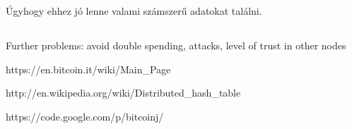 \documentclass[a4paper,12pt]{article}
\begin{document}
Úgyhogy ehhez jó lenne valami számszerű adatokat találni.

\subsection{}
Further problems: avoid double spending, attacks, level of trust in other nodes




\newpage
\begin{thebibliography}{9}
\bibitem{}
https://en.bitcoin.it/wiki/Main\_Page
\label{bitcoinwiki}

\bibitem{}
http://en.wikipedia.org/wiki/Distributed\_hash\_table
\label{dhtwiki}

\bibitem{}
https://code.google.com/p/bitcoinj/
\label{bitcoinj}

\end{thebibliography}
\end{document}
